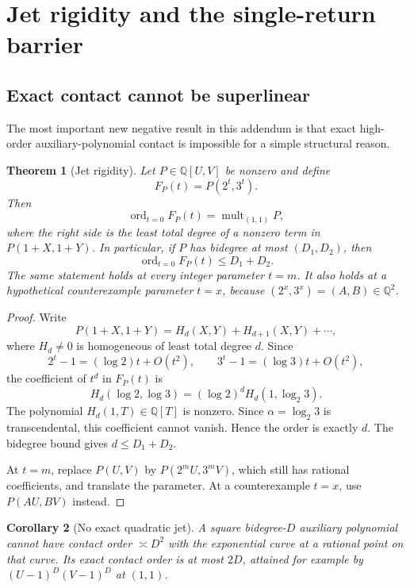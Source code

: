 \documentclass[11pt]{article}
\newtheorem{theorem}{Theorem}[section]
\newtheorem{corollary}[theorem]{Corollary}
\theoremstyle{definition}
\theoremstyle{remark}
\newcommand{\QQ}{\mathbb Q}
\newcommand{\ord}{\operatorname{ord}}
\begin{document}
\section{Jet rigidity and the single-return barrier}\label{sec:jet}

\subsection{Exact contact cannot be superlinear}

The most important new negative result in this addendum is that exact high-order auxiliary-polynomial contact is impossible for a simple structural reason.

\begin{theorem}[Jet rigidity]\label{thm:jet-rigidity}
Let $P\in\QQ[U,V]$ be nonzero and define
\[
 F_P(t)=P(2^t,3^t).
\]
Then
\begin{equation}\label{eq:jet-equality}
 \ord_{t=0}F_P(t)=\operatorname{mult}_{(1,1)}P,
\end{equation}
where the right side is the least total degree of a nonzero term in $P(1+X,1+Y)$. In particular, if $P$ has bidegree at most $(D_1,D_2)$, then
\begin{equation}\label{eq:contact-ceiling}
 \ord_{t=0}F_P(t)\le D_1+D_2.
\end{equation}
The same statement holds at every integer parameter $t=m$. It also holds at a hypothetical counterexample parameter $t=x$, because $(2^x,3^x)=(A,B)\in\QQ^2$.
\end{theorem}

\begin{proof}
Write
\[
 P(1+X,1+Y)=H_d(X,Y)+H_{d+1}(X,Y)+\cdots,
\]
where $H_d\ne0$ is homogeneous of least total degree $d$. Since
\[
 2^t-1=(\log2)t+O(t^2),\qquad
 3^t-1=(\log3)t+O(t^2),
\]
the coefficient of $t^d$ in $F_P(t)$ is
\[
 H_d(\log2,\log3)
 =(\log2)^d H_d\!\left(1,\log_2 3\right).
\]
The polynomial $H_d(1,T)\in\QQ[T]$ is nonzero. Since $\alpha=\log_2 3$ is transcendental, this coefficient cannot vanish. Hence the order is exactly $d$. The bidegree bound gives $d\le D_1+D_2$.

At $t=m$, replace $P(U,V)$ by $P(2^mU,3^mV)$, which still has rational coefficients, and translate the parameter. At a counterexample $t=x$, use $P(AU,BV)$ instead.
\end{proof}

\begin{corollary}[No exact quadratic jet]
A square bidegree-$D$ auxiliary polynomial cannot have contact order $\asymp D^2$ with the exponential curve at a rational point on that curve. Its exact contact order is at most $2D$, attained for example by $(U-1)^D(V-1)^D$ at $(1,1)$.
\end{corollary}
\end{document}
